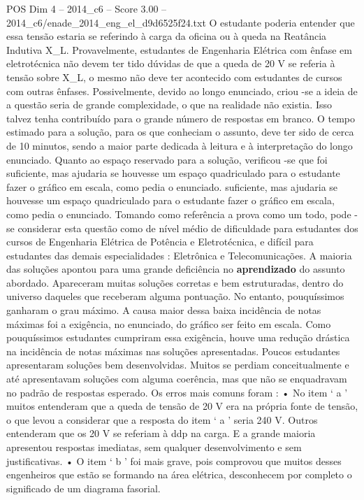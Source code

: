\begin{textsample}{POS Dim 4 – 2014\_c6 – Score 3.00 – 2014\_c6/enade\_2014\_eng\_el\_d9d6525f24.txt}
O estudante poderia entender que essa tensão estaria se referindo à carga da oficina ou à queda na Reatância Indutiva X\_L.
Provavelmente, estudantes de Engenharia Elétrica com ênfase em eletrotécnica não devem ter tido dúvidas de que a queda de 20 V se referia à tensão sobre X\_L, o mesmo não deve ter acontecido com estudantes de cursos com outras ênfases.
Possivelmente, devido ao longo enunciado, criou -se a ideia de a questão seria de grande complexidade, o que na realidade não existia.
Isso talvez tenha contribuído para o grande número de respostas em branco.
O tempo estimado para a solução, para os que conheciam o assunto, deve ter sido de cerca de 10 minutos, sendo a maior parte dedicada à leitura e à interpretação do longo enunciado.
Quanto ao espaço reservado para a solução, verificou -se que foi suficiente, mas ajudaria se houvesse um espaço quadriculado para o estudante fazer o gráfico em escala, como pedia o enunciado. suficiente, mas ajudaria se houvesse um espaço quadriculado para o estudante fazer o gráfico em escala, como pedia o enunciado.
Tomando como referência a prova como um todo, pode -se considerar esta questão como de nível médio de dificuldade para estudantes dos cursos de Engenharia Elétrica de Potência e Eletrotécnica, e difícil para estudantes das demais especialidades : Eletrônica e Telecomunicações.
A maioria das soluções apontou para uma grande deficiência no \textbf{aprendizado} do assunto abordado.
Apareceram muitas soluções corretas e bem estruturadas, dentro do universo daqueles que receberam alguma pontuação.
No entanto, pouquíssimos ganharam o grau máximo.
A causa maior dessa baixa incidência de notas máximas foi a exigência, no enunciado, do gráfico ser feito em escala.
Como pouquíssimos estudantes cumpriram essa exigência, houve uma redução drástica na incidência de notas máximas nas soluções apresentadas.
Poucos estudantes apresentaram soluções bem desenvolvidas.
Muitos se perdiam conceitualmente e até apresentavam soluções com alguma coerência, mas que não se enquadravam no padrão de respostas esperado.
Os erros mais comuns foram : • No item ‘ a ’ muitos entenderam que a queda de tensão de 20 V era na própria fonte de tensão, o que levou a considerar que a resposta do item ‘ a ’ seria 240 V.
Outros entenderam que os 20 V se referiam à ddp na carga.
E a grande maioria apresentou respostas imediatas, sem qualquer desenvolvimento e sem justificativas. • O item ‘ b ’ foi mais grave, pois comprovou que muitos desses engenheiros que estão se formando na área elétrica, desconhecem por completo o significado de um diagrama fasorial.

\end{textsample}
